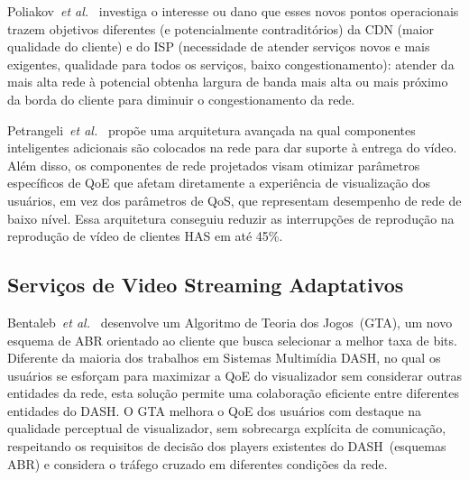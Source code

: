 Poliakov~\textit{et al.}~\cite{poliakovPHD2018} 
investiga o interesse ou dano que esses novos pontos operacionais trazem objetivos diferentes (e potencialmente contraditórios) da CDN (maior qualidade do cliente) e do ISP (necessidade de atender serviços novos e mais exigentes, qualidade para todos os serviços, baixo congestionamento): atender da mais alta rede à potencial obtenha largura de banda mais alta ou mais próximo da borda do cliente para diminuir o congestionamento da rede.


Petrangeli~\textit{et al.}~\cite{petrangeli2019IM}
propõe uma arquitetura avançada na qual componentes inteligentes adicionais são colocados na rede para dar suporte à entrega do vídeo. Além disso, os componentes de rede projetados visam otimizar parâmetros específicos de QoE que afetam diretamente a experiência de visualização dos usuários, em vez dos parâmetros de QoS, que representam desempenho de rede de baixo nível.
Essa arquitetura conseguiu reduzir as interrupções de reprodução na reprodução de vídeo de clientes HAS em até 45\%.


\subsection{Serviços de Video Streaming Adaptativos}


Bentaleb~\textit{et al.}~\cite{bentaleb:2018:MSys} desenvolve um Algoritmo de Teoria dos Jogos~(GTA), um novo esquema de ABR orientado ao cliente que busca selecionar a melhor taxa de bits.
Diferente da maioria dos trabalhos em Sistemas Multimídia DASH, no qual os usuários se esforçam para maximizar a QoE do visualizador sem considerar outras entidades da rede, esta solução permite uma colaboração eficiente entre diferentes entidades do DASH. 
O GTA melhora o QoE dos usuários com destaque na qualidade perceptual de visualizador, sem sobrecarga explícita de comunicação, respeitando os requisitos de decisão dos players existentes do DASH~(esquemas ABR) e considera o tráfego cruzado em diferentes condições da rede. 

